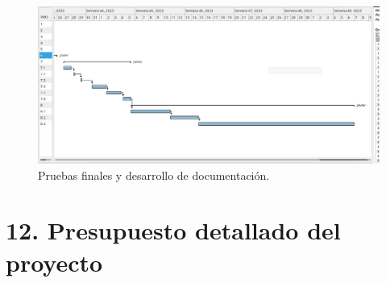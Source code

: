 \documentclass[
11pt, %
]{charter}
\begin{document}
\begin{landscape}
\begin{figure}[htpb]
\centering 
\includegraphics[height=.7\textheight]{./Figuras/Gantt_7-8.png}
\caption{Pruebas finales y desarrollo de documentación.}
\label{fig:diagGantt}
\end{figure}
\end{landscape}

\section{12. Presupuesto detallado del proyecto}
\label{sec:presupuesto}
\end{document}
